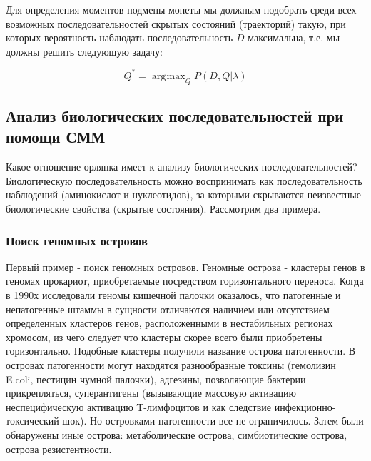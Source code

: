 \documentclass[letterpaper, 11pt]{article}
\DeclareMathOperator*{\argmax}{\arg\!\max}
\begin{document}
Для определения моментов подмены монеты мы должным подобрать среди всех возможных последовательностей скрытых состояний (траекторий) такую, при которых вероятность наблюдать последовательность $D$ максимальна, т.е. мы должны решить следующую задачу:

$$Q^*=\argmax_Q P(D,Q|\lambda)$$

\subsection{Анализ биологических последовательностей при помощи СММ}

Какое отношение орлянка имеет к анализу биологических последовательностей? Биологическую последовательность можно воспринимать как последовательность наблюдений (аминокислот и нуклеотидов), за которыми скрываются неизвестные биологические свойства (скрытые состояния). Рассмотрим два примера. 

\subsubsection{Поиск геномных островов}

Первый пример \-- поиск геномных островов. Геномные острова - кластеры генов в геномах прокариот, приобретаемые посредством горизонтального переноса. Когда в 1990х исследовали геномы кишечной палочки оказалось, что патогенные и непатогенные штаммы в сущности отличаются наличием или отсутствием определенных кластеров генов, расположенными в нестабильных регионах хромосом, из чего следует что кластеры скорее всего были приобретены горизонтально. Подобные кластеры получили название острова патогенности. В островах патогенности могут находятся разнообразные токсины (гемолизин E.coli, пестицин чумной палочки), адгезины, позволяющие бактерии прикрепляться, суперантигены (вызывающие массовую активацию неспецифическую активацию T-лимфоцитов и как следствие инфекционно-токсический шок). Но островками патогенности все не ограничилось. Затем были обнаружены иные острова: метаболические острова, симбиотические острова, острова резистентности.
\end{document}
